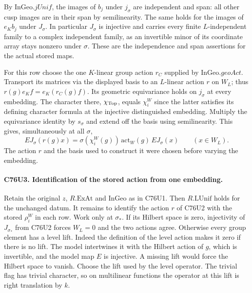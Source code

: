 By $\mathrm{InGeo}.jUnif$, the images of $b_j$ under $j_\sigma$
are independent and span: all other cusp images are in their span
by semilinearity. The same holds for the images of $e_K b_j$ under
$J_\sigma$. In particular $J_\sigma$ is injective and carries every
finite $L$-independent family to a complex independent family, as
an invertible minor of its coordinate array stays nonzero under
$\sigma$. These are the independence and span assertions for the
actual stored maps.

For this row choose the one $K$-linear group action $r_C$ supplied
by $\mathrm{InGeo}.geoAct$. Transport its matrices via the displayed
basis to an $L$-linear action $r$ on $W_L$; thus
$r(g)e_K f=e_K(r_C(g)f)$. Its geometric equivariance holds on
$j_\sigma$ at every embedding. The character there, $\chi_{\rm Top}$,
equals $\chi_i^W$ since the latter satisfies its defining character
formula at the injective distinguished embedding. Multiply the
equivariance identity by $s_\sigma$ and extend off the basis using
semilinearity. This gives, simultaneously at all $\sigma$,
\[
 E J_\sigma(r(g)x)=\sigma(\chi_i^W(g))\,
     \mathrm{act}_W(g)\,E J_\sigma(x)\qquad(x\in W_L).
\]
The action $r$ and the basis used to construct it were chosen before
varying the embedding.

\paragraph{C76U3. Identification of the stored action from one embedding.}
Retain the original $z$, $R.\mathrm{ExAt}$ and $\mathrm{InGeo}$ as
in C76U1. Then $R.\mathrm{LUnif}$ holds for the unchanged datum.
It remains to identify the action $r$ of C76U2 with the stored
$\rho^W_i$ in each row. Work only at $\sigma_*$. If its Hilbert
space is zero, injectivity of $J_{\sigma_*}$ from C76U2 forces
$W_L=0$ and the two actions agree. Otherwise every group element
has a level lift. Indeed the definition of the level action makes
it zero if there is no lift. The model intertwines it with the
Hilbert action of $g$, which is invertible, and the model map $E$
is injective. A missing lift would force the Hilbert space to vanish.
Choose the lift used by the level operator. The trivial flag has
trivial character, so on multilinear functions the operator at this
lift is right translation by $k$.

